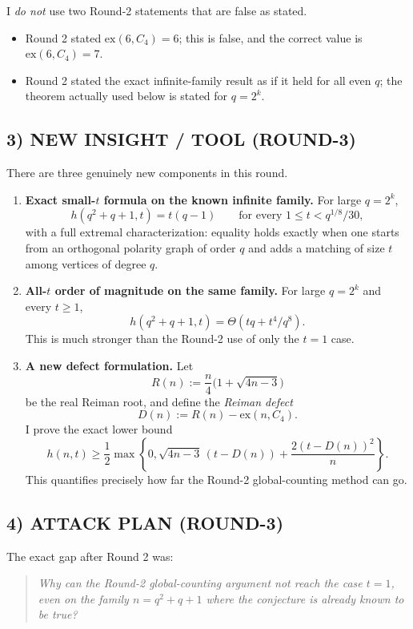 I \emph{do not} use two Round-2 statements that are false as stated.
\begin{itemize}
\item Round 2 stated $\mathrm{ex}(6,C_4)=6$; this is false, and the correct value is $\mathrm{ex}(6,C_4)=7$.
\item Round 2 stated the exact infinite-family result as if it held for all even $q$; the theorem actually used below is stated for $q=2^k$.
\end{itemize}

\subsection*{3) NEW INSIGHT / TOOL (ROUND-3)}
There are three genuinely new components in this round.
\begin{enumerate}
\item \textbf{Exact small-$t$ formula on the known infinite family.} For large $q=2^k$,
\[
h(q^2+q+1,t)=t(q-1)\qquad\text{for every }1\le t<q^{1/8}/30,
\]
with a full extremal characterization: equality holds exactly when one starts from an orthogonal polarity graph of order $q$ and adds a matching of size $t$ among vertices of degree $q$.
\item \textbf{All-$t$ order of magnitude on the same family.} For large $q=2^k$ and every $t\ge 1$,
\[
h(q^2+q+1,t)=\Theta(tq+t^4/q^8).
\]
This is much stronger than the Round-2 use of only the $t=1$ case.
\item \textbf{A new defect formulation.} Let
\[
R(n):=\frac n4\bigl(1+\sqrt{4n-3}\bigr)
\]
be the real Reiman root, and define the \emph{Reiman defect}
\[
D(n):=R(n)-\mathrm{ex}(n,C_4).
\]
I prove the exact lower bound
\[
h(n,t)\ge \frac12\max\left\{0,\sqrt{4n-3}\,(t-D(n))+\frac{2(t-D(n))^2}{n}\right\}.
\]
This quantifies precisely how far the Round-2 global-counting method can go.
\end{enumerate}

\subsection*{4) ATTACK PLAN (ROUND-3)}
The exact gap after Round 2 was:
\begin{quote}
\emph{Why can the Round-2 global-counting argument not reach the case $t=1$, even on the family $n=q^2+q+1$ where the conjecture is already known to be true?}
\end{quote}

